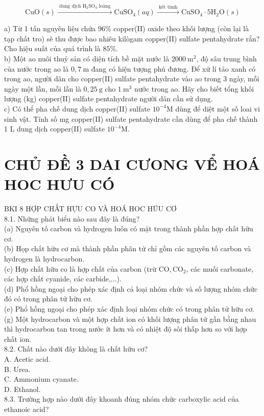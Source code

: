 \documentclass[10pt]{article}
\begin{document}
$$
\mathrm{CuO}(s) \xrightarrow{\text { dung dịch } \mathrm{H}_{2} \mathrm{SO}_{4} \text { loâng }} \mathrm{CuSO}_{4}(a q) \xrightarrow{\text { kêt timh }} \mathrm{CuSO}_{4} \cdot 5 \mathrm{H}_{2} \mathrm{O}(s)
$$

a) Từ 1 tấn nguyên liệu chứa $96 \%$ copper(II) oxide theo khối lượng (còn lại là tạp chất tro) sẽ thu được bao nhiêu kilògam copper(II) sulfate pentahydrate rắn? Cho hiệu suất của quá trình là $85 \%$.\\
b) Một ao nuôi thuỷ sản có diện tích bề mặt nước là $2000 \mathrm{~m}^{2}$, độ sâu trung bình của nước trong ao là $0,7 \mathrm{~m}$ đang có hiện tượng phú đương. Để xử lí tảo xanh có trong ao, người dân cho copper(II) sulfate pentahydrate vào ao trong 3 ngày, mỗi ngày một lần, mỗi lần là $0,25 \mathrm{~g}$ cho $1 \mathrm{~m}^{3}$ nước trong ao. Hãy cho biết tổng khối lượng (kg) copper(II) sulfate pentahydrate người dân cần sử dụng.\\
c) Có thể pha chế dung dịch copper(II) sulfate $10^{-4} \mathrm{M}$ dùng để diệt một số loai vi sinh vật. Tính số mg copper(II) sulfate pentahydrate cần dùng để pha chế thành 1 L dung dịch copper(II) sulfate $10^{-4} \mathrm{M}$.

\section*{CHỦ ĐỀ 3 DAI CƯONG VỂ HOÁ HOC HƯU CÓ}
BKI 8 HỢP CHẤT HỰU CO VÀ HOÁ HOC HÜU CƠ\\
8.1. Những phát biểu nào sau đây là đúng?\\
(a) Nguyên tố carbon và hydrogen luôn có mặt trong thành phần hợp chất hữu cơ.\\
(b) Họp chất hữu cơ mà thành phần phân tử chỉ gồm các nguyên tố carbon và hydrogen là hydrocarbon.\\
(c) Hợp chất hữu co là hợp chất của carbon (trừ $\mathrm{CO}, \mathrm{CO}_{2}$, các muối carbonate, các hợp chất cyanide, các carbide,...).\\
(d) Phổ hồng ngoại cho phép xác định cả loại nhóm chức và số lượng nhóm chức đó có trong phân tử hữu cơ.\\
(e) Phổ hồng ngoại cho phép xác định loại nhóm chức có trong phân tử hữu cơ.\\
(g) Một hydrocarbon và một hợp chất ion có khối lượng phân tử gần bằng nhau thì hydrocarbon tan trong nước ít hơn và có nhiệt độ sôi thấp hơn so với hợp chất ion.\\
8.2. Chất nào dưới đây không là chất hữu cơ?\\
A. Acetic acid.\\
B. Urea.\\
C. Ammonium cyanate.\\
D. Ethanol.\\
8.3. Trường hợp nào dưới đây khoanh đúng nhóm chức carboxylic acid của ethanoic acid?
\end{document}
